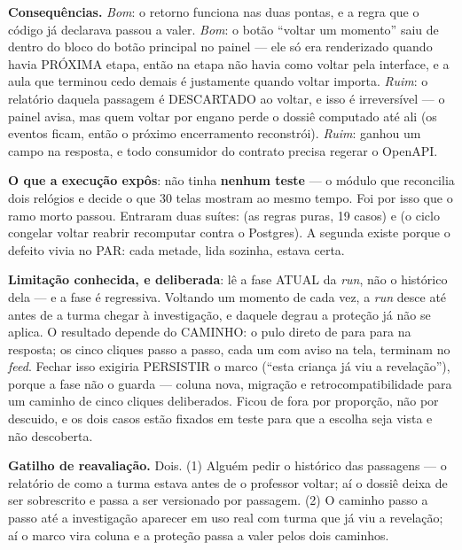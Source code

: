 \textbf{Consequências.} \emph{Bom}: o retorno funciona nas duas pontas, e a
regra que o código já declarava passou a valer. \emph{Bom}: o botão
\enquote{voltar um momento} saiu de dentro do bloco do botão principal no painel
--- ele só era renderizado quando havia PRÓXIMA etapa, então na etapa 
não havia como voltar pela interface, e a aula que terminou cedo demais é
justamente quando voltar importa. \emph{Ruim}: o relatório daquela passagem é
DESCARTADO ao voltar, e isso é irreversível --- o painel avisa, mas quem voltar
por engano perde o dossiê computado até ali (os eventos ficam, então o próximo
encerramento reconstrói). \emph{Ruim}:  ganhou um
campo na resposta, e todo consumidor do contrato precisa regerar o OpenAPI.

\textbf{O que a execução expôs}:  não tinha
\textbf{nenhum teste} --- o módulo que reconcilia dois relógios e decide o que
30 telas mostram ao mesmo tempo. Foi por isso que o ramo morto passou. Entraram
duas suítes:  (as regras puras, 19 casos) e
 (o ciclo congelar \seta{} voltar
\seta{} reabrir \seta{} recomputar contra o Postgres). A segunda existe porque o
defeito vivia no PAR: cada metade, lida sozinha, estava certa.

\textbf{Limitação conhecida, e deliberada}:  lê a fase
ATUAL da \emph{run}, não o histórico dela --- e a fase é regressiva. Voltando um
momento de cada vez, a \emph{run} desce até  antes de a turma
chegar à investigação, e daquele degrau a proteção já não se aplica. O resultado
depende do CAMINHO: o pulo direto de  para
 para na resposta; os cinco cliques passo a passo, cada um com
aviso na tela, terminam no \emph{feed}. Fechar isso exigiria PERSISTIR o marco
(\enquote{esta criança já viu a revelação}), porque a fase não o guarda ---
coluna nova, migração e retrocompatibilidade para um caminho de cinco cliques
deliberados. Ficou de fora por proporção, não por descuido, e os dois casos
estão fixados em teste para que a escolha seja vista e não descoberta.

\textbf{Gatilho de reavaliação.} Dois. (1) Alguém pedir o histórico das
passagens --- o relatório de como a turma estava antes de o professor voltar; aí
o dossiê deixa de ser sobrescrito e passa a ser versionado por passagem. (2) O
caminho passo a passo até a investigação aparecer em uso real com turma que já
viu a revelação; aí o marco vira coluna e a proteção passa a valer pelos dois
caminhos.

